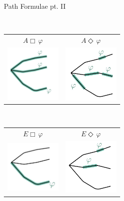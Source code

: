 \documentclass{beamer}
\begin{document}
\begin{slide}{Path Formulae pt. II}
\centering

~\\
\begin{tabular}{cc}
  \Large $A \Box\, \varphi$ & \Large $A \Diamond \, \varphi$ \\
 \includegraphics[width=2.8cm]{./images/AA.jpg} &
 \hspace{1cm} \includegraphics[width=2.8cm]{./images/AE.jpg}
\end{tabular}

~\\[2mm]

\begin{tabular}{cc}
  \Large $E \Box\, \varphi$ & \Large $E \Diamond\, \varphi$ \\
 \includegraphics[width=2.8cm]{./images/EA.jpg} &   \hspace{1cm} \includegraphics[width=2.8cm]{./images/EE.jpg}
\end{tabular}
\end{slide}
\end{document}

